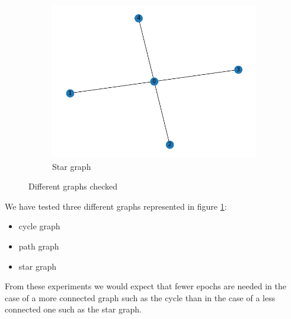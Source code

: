 \documentclass[a4paper,11pt,oneside]{book}
\begin{document}
\begin{figure}[H]
\begin{subfigure}{0.32\textwidth}
    \includegraphics[width=\textwidth]{star/graph}
    \caption{Star graph}
    \end{subfigure}
\caption{Different graphs checked}
\label{Graphs}
\end{figure}

\bigskip
We have tested three different graphs represented in figure \ref{Graphs}:
\begin{itemize}
\item cycle graph
\item path graph
\item star graph
\end{itemize}

From these experiments we would expect that fewer epochs are needed in the case of a more connected graph such as the cycle than in the case of a less connected one such as the star graph.
\end{document}
